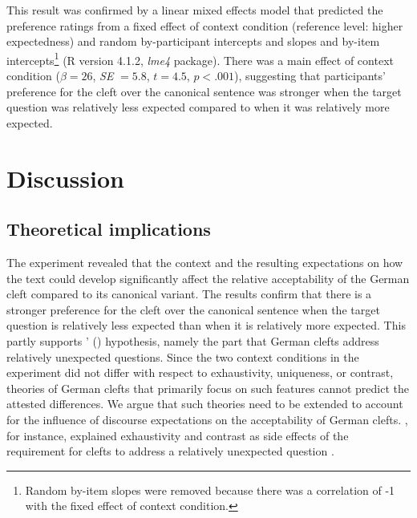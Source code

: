 \documentclass{salt}
\begin{document}
This result was confirmed by a linear mixed effects model that predicted the preference ratings from a fixed effect of context condition (reference level: higher expectedness) and random by-participant intercepts and slopes and by-item intercepts\footnote{Random by-item slopes were removed because there was a correlation of -1 with the fixed effect of context condition.} (R version 4.1.2, \textit{lme4} package). There was a main effect of context condition ($\beta=26$, \textit{SE} $=5.8$, $t=4.5$, $p<.001$), suggesting that participants' preference for the cleft over the canonical sentence was stronger when the target question was relatively less expected compared to when it was relatively more expected.


\section{Discussion}
\label{sec:discussion}

\subsection{Theoretical implications}

The experiment revealed that the context and the resulting expectations on how the text could develop significantly affect the relative acceptability of the German cleft compared to its canonical variant. The results confirm that there is a stronger preference for the cleft over the canonical sentence when the target question is relatively less expected than when it is relatively more expected. This partly supports  \citeauthor{tonnis_2021}' (\citeyear{tonnis_2021}) hypothesis, namely the part that German clefts address relatively unexpected questions. Since the two context conditions in the experiment did not differ with respect to exhaustivity, uniqueness, or contrast, theories of German clefts that primarily focus on such features cannot predict the attested differences. We argue that such theories need to be extended to account for the influence of discourse expectations on the acceptability of German clefts. \cite{tonnis_2021}, for instance, explained exhaustivity and contrast as side effects of the requirement for clefts to address a relatively unexpected question \cite[more details in][301--306]{tonnis_2021}.
\end{document}
